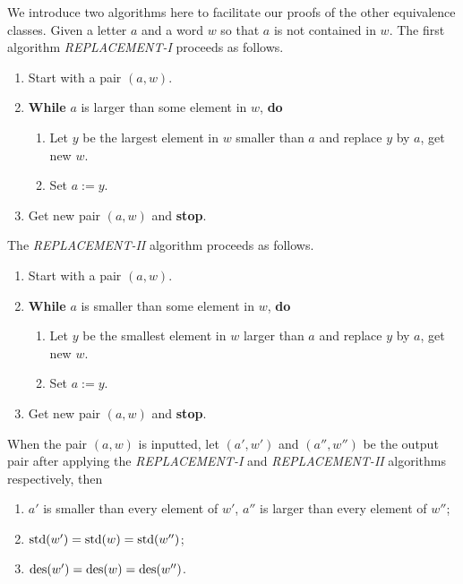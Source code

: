 We introduce two algorithms here to facilitate our proofs of the other equivalence classes.
Given a letter $a$ and a word $w$ so that $a$ is not contained in $w$.
The first algorithm \textit{REPLACEMENT-I} proceeds as follows.
\begin{enumerate}[label=(\arabic*)]
    \item Start with a pair $(a,w)$.
    \item \textbf{While} $a$ is larger than some element in $w$, \textbf{do} \label{Re2}
    \begin{enumerate}[label=(2.\arabic*)]
        \item Let $y$ be the largest element in $w$ smaller than $a$ and replace $y$ by $a$, get new $w$. \label{Re2.1}
        \item Set $a:=y$.
    \end{enumerate}
    \item Get new pair $(a,w)$ and \textbf{stop}.
\end{enumerate}
The \textit{REPLACEMENT-II} algorithm proceeds as follows.
\begin{enumerate}[label=(\arabic*)]
    \item Start with a pair $(a,w)$.
    \item \textbf{While} $a$ is smaller than some element in $w$, \textbf{do} \label{Re2-}
    \begin{enumerate}[label=(2.\arabic*)]
        \item Let $y$ be the smallest element in $w$ larger than $a$ and replace $y$ by $a$, get new $w$. \label{Re2.1-}
        \item Set $a:=y$.
    \end{enumerate}
    \item Get new pair $(a,w)$ and \textbf{stop}.
\end{enumerate}

\begin{proposition}
    When the pair $(a,w)$ is inputted, let $(a',w')$ and $(a'',w'')$ be the output pair after applying the \textit{REPLACEMENT-I} and \textit{REPLACEMENT-II} algorithms respectively, then 
    \begin{enumerate} %
        \item $a'$ is smaller than every element of $w'$, $a''$ is larger than every element of $w''$; 
        \item $\mathrm{std}(w')=\mathrm{std}(w)=\mathrm{std}(w'')$;
        \item $\mathrm{des}(w')=\mathrm{des}(w)=\mathrm{des}(w'')$.
    \end{enumerate}
\end{proposition}

